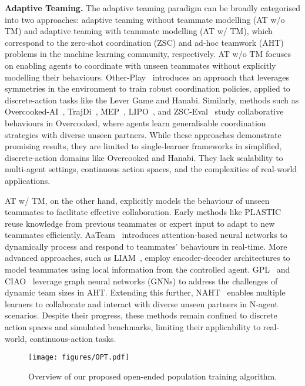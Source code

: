 \textbf{Adaptive Teaming. }The adaptive teaming paradigm can be broadly categorised into two approaches: adaptive teaming without teammate modelling (AT w/o TM) and adaptive teaming with teammate modelling (AT w/ TM), which correspond to the zero-shot coordination (ZSC) and ad-hoc teamwork (AHT) problems in the machine learning community, respectively.
AT w/o TM focuses on enabling agents to coordinate with unseen teammates without explicitly modelling their behaviours. Other-Play~\cite{hu2020other} introduces an approach that leverages symmetries in the environment to train robust coordination policies, applied to discrete-action tasks like the Lever Game and Hanabi. Similarly, methods such as Overcooked-AI~\cite{carroll2019utility}, TrajDi~\cite{TrajDi}, MEP~\cite{MEP}, LIPO~\cite{charakorn2023generating}, and ZSC-Eval~\cite{wang2024zsc} study collaborative behaviours in Overcooked, where agents learn generalisable coordination strategies with diverse unseen partners. While these approaches demonstrate promising results, they are limited to single-learner frameworks in simplified, discrete-action domains like Overcooked and Hanabi. They lack scalability to multi-agent settings, continuous action spaces, and the complexities of real-world applications.

AT w/ TM, on the other hand, explicitly models the behaviour of unseen teammates to facilitate effective collaboration. Early methods like PLASTIC~\cite{barrett2017making} reuse knowledge from previous teammates or expert input to adapt to new teammates efficiently. AaTeam~\cite{chen2020aateam} introduces attention-based neural networks to dynamically process and respond to teammates’ behaviours in real-time.
More advanced approaches, such as LIAM~\cite{papoudakis2021agent}, employ encoder-decoder architectures to model teammates using local information from the controlled agent. GPL~\cite{rahman2021towards} and CIAO~\cite{jianhong2024oaht} leverage graph neural networks (GNNs) to address the challenges of dynamic team sizes in AHT. Extending this further, NAHT~\cite{wang2024n} enables multiple learners to collaborate and interact with diverse unseen partners in N-agent scenarios.
Despite their progress, these methods remain confined to discrete action spaces and simulated benchmarks, limiting their applicability to real-world, continuous-action tasks. 

\begin{figure}
    \centering
    \texttt{[image: figures/OPT.pdf]}
    \caption{Overview of our proposed open-ended population training algorithm.}
    \label{fig:opt}
\end{figure}

